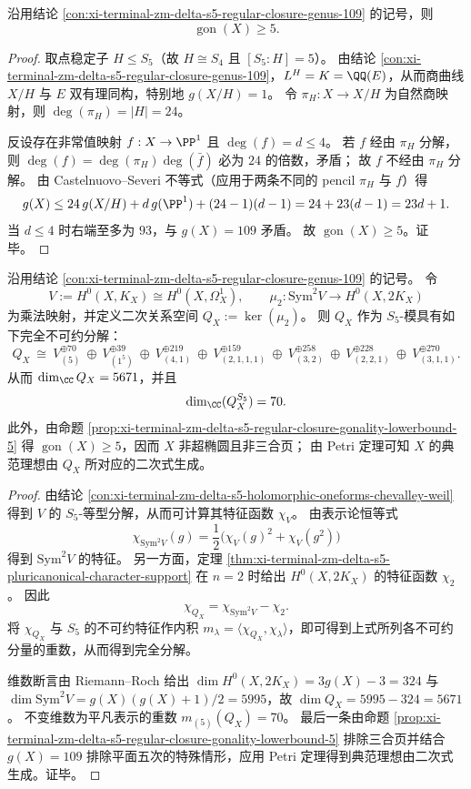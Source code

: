 \begin{proposition}\label{prop:xi-terminal-zm-delta-s5-regular-closure-gonality-lowerbound-5}
沿用结论 \ref{con:xi-terminal-zm-delta-s5-regular-closure-genus-109} 的记号，则
\[
\operatorname{gon}(X)\ge 5.
\]
\end{proposition}
\begin{proof}
取点稳定子 \(H\le S_5\)（故 \(H\cong S_4\) 且 \([S_5:H]=5\)）。
由结论 \ref{con:xi-terminal-zm-delta-s5-regular-closure-genus-109}，\(L^{H}=K=\QQ(E)\)，从而商曲线 \(X/H\) 与 \(E\) 双有理同构，特别地 \(g(X/H)=1\)。
令
\(
\pi_H:X\to X/H
\)
为自然商映射，则 \(\deg(\pi_H)=|H|=24\)。
\par
反设存在非常值映射 \(f:X\to\PP^1\) 且 \(\deg(f)=d\le 4\)。
若 \(f\) 经由 \(\pi_H\) 分解，则 \(\deg(f)=\deg(\pi_H)\deg(\bar f)\) 必为 \(24\) 的倍数，矛盾；
故 \(f\) 不经由 \(\pi_H\) 分解。
由 Castelnuovo--Severi 不等式（应用于两条不同的 pencil \(\pi_H\) 与 \(f\)）得
\[
g(X)\le 24\,g(X/H)+d\,g(\PP^1)+(24-1)(d-1)=24+23(d-1)=23d+1.
\]
当 \(d\le 4\) 时右端至多为 \(93\)，与 \(g(X)=109\) 矛盾。
故 \(\operatorname{gon}(X)\ge 5\)。证毕。
\end{proof}

\begin{theorem}\label{thm:xi-terminal-zm-delta-s5-canonical-quadrics-irrep-decomposition}
沿用结论 \ref{con:xi-terminal-zm-delta-s5-regular-closure-genus-109} 的记号。
令
\[
V:=H^0(X,K_X)\cong H^0(X,\Omega_X^1),
\qquad
\mu_2:\mathrm{Sym}^2V\longrightarrow H^0(X,2K_X)
\]
为乘法映射，并定义二次关系空间 \(Q_X:=\ker(\mu_2)\)。
则 \(Q_X\) 作为 \(S_5\)-模具有如下完全不可约分解：
\[
Q_X\ \cong\
V_{(5)}^{\oplus 70}\ \oplus\ V_{(1^5)}^{\oplus 39}\ \oplus\ V_{(4,1)}^{\oplus 219}\ \oplus\ V_{(2,1,1,1)}^{\oplus 159}\
\oplus\ V_{(3,2)}^{\oplus 258}\ \oplus\ V_{(2,2,1)}^{\oplus 228}\ \oplus\ V_{(3,1,1)}^{\oplus 270}.
\]
从而 \(\dim_\CC Q_X=5671\)，并且
\[
\dim_\CC(Q_X^{S_5})=70.
\]
此外，由命题 \ref{prop:xi-terminal-zm-delta-s5-regular-closure-gonality-lowerbound-5} 得 \(\operatorname{gon}(X)\ge 5\)，因而 \(X\) 非超椭圆且非三合页；
由 Petri 定理可知 \(X\) 的典范理想由 \(Q_X\) 所对应的二次式生成。
\end{theorem}
\begin{proof}
由结论 \ref{con:xi-terminal-zm-delta-s5-holomorphic-oneforms-chevalley-weil} 得到 \(V\) 的 \(S_5\)-等型分解，从而可计算其特征函数 \(\chi_V\)。
由表示论恒等式
\[
\chi_{\mathrm{Sym}^2V}(g)=\frac{1}{2}\bigl(\chi_V(g)^2+\chi_V(g^2)\bigr)
\]
得到 \(\mathrm{Sym}^2V\) 的特征。
另一方面，定理 \ref{thm:xi-terminal-zm-delta-s5-pluricanonical-character-support} 在 \(n=2\) 时给出 \(H^0(X,2K_X)\) 的特征函数 \(\chi_2\)。
因此
\[
\chi_{Q_X}=\chi_{\mathrm{Sym}^2V}-\chi_2.
\]
将 \(\chi_{Q_X}\) 与 \(S_5\) 的不可约特征作内积 \(m_\lambda=\langle \chi_{Q_X},\chi_\lambda\rangle\)，即可得到上式所列各不可约分量的重数，从而得到完全分解。
\par
维数断言由 Riemann--Roch 给出 \(\dim H^0(X,2K_X)=3g(X)-3=324\) 与 \(\dim \mathrm{Sym}^2V=g(X)(g(X)+1)/2=5995\)，故 \(\dim Q_X=5995-324=5671\)。
不变维数为平凡表示的重数 \(m_{(5)}(Q_X)=70\)。
最后一条由命题 \ref{prop:xi-terminal-zm-delta-s5-regular-closure-gonality-lowerbound-5} 排除三合页并结合 \(g(X)=109\) 排除平面五次的特殊情形，应用 Petri 定理得到典范理想由二次式生成。证毕。
\end{proof}

